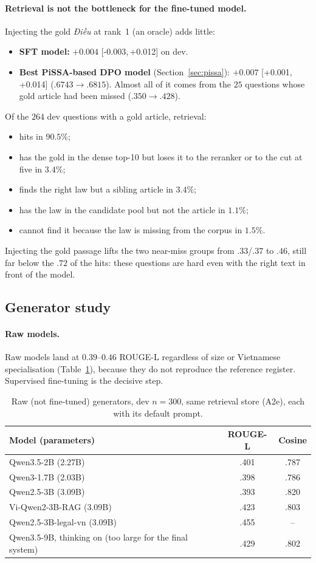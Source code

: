 \documentclass[11pt,a4paper]{article}
\newcommand{\rl}{ROUGE-L}
\newcommand{\dieu}{\textit{Điều}}
\newcommand{\ci}[2]{{\scriptsize[#1,\,#2]}}
\begin{document}
\paragraph{Retrieval is not the bottleneck for the fine-tuned model.}
Injecting the gold \dieu{} at rank~1 (an oracle) adds little:
\begin{itemize}[leftmargin=*]
\item \textbf{SFT model:} $+0.004$ \ci{-0.003}{+0.012} on dev.
\item \textbf{Best PiSSA-based DPO model} (Section~\ref{sec:pissa}): $+0.007$ \ci{+0.001}{+0.014} ($.6743\to.6815$). Almost all of it comes from the $25$ questions whose gold article had been missed ($.350\to.428$).
\end{itemize}
Of the $264$ dev questions with a gold article, retrieval:
\begin{itemize}[leftmargin=*]
\item hits in $90.5\%$;
\item has the gold in the dense top-10 but loses it to the reranker or to the cut at five in $3.4\%$;
\item finds the right law but a sibling article in $3.4\%$;
\item has the law in the candidate pool but not the article in $1.1\%$;
\item cannot find it because the law is missing from the corpus in $1.5\%$.
\end{itemize}
Injecting the gold passage lifts the two near-miss groups from $.33$/$.37$ to $.46$, still far below the $.72$ of the hits: these questions are hard even with the right text in front of the model.

\subsection{Generator study}\label{sec:generator}
\paragraph{Raw models.}
Raw models land at $0.39$--$0.46$ \rl{} regardless of size or Vietnamese specialisation (Table~\ref{tab:raw}), because they do not reproduce the reference register. Supervised fine-tuning is the decisive step.
\begin{table}[H]
\centering
\caption{Raw (not fine-tuned) generators, dev $n{=}300$, same retrieval store (A2e), each with its default prompt.}\label{tab:raw}
\begin{tabular}{@{}lcc@{}}
\toprule
Model (parameters) & \rl{} & Cosine\\
\midrule
Qwen3.5-2B (2.27B) & .401 & .787\\
Qwen3-1.7B (2.03B) & .398 & .786\\
Qwen2.5-3B (3.09B) & .393 & .820\\
Vi-Qwen2-3B-RAG (3.09B) & .423 & .803\\
Qwen2.5-3B-legal-vn (3.09B) & .455 & --\\
Qwen3.5-9B, thinking on (too large for the final system) & .429 & .802\\
\bottomrule
\end{tabular}
\end{table}
\end{document}
